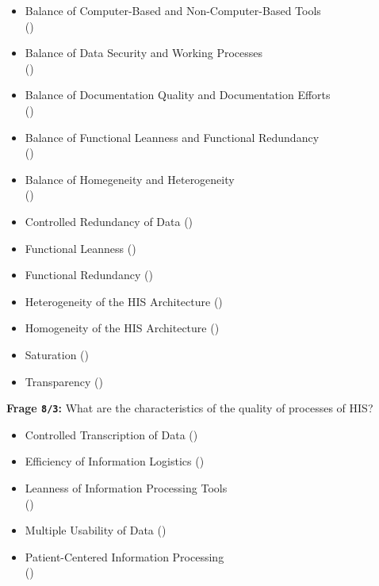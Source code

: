 \begin{itemize}
  \item Balance of Computer-Based and Non-Computer-Based Tools \\
  ()
  \item Balance of Data Security and Working Processes \\
  ()
  \item Balance of Documentation Quality and Documentation Efforts \\
  ()
  \item Balance of Functional Leanness and Functional Redundancy \\
  ()
  \item Balance of Homegeneity and Heterogeneity \\
  ()
  \item Controlled Redundancy of Data ()
  \item Functional Leanness ()
  \item Functional Redundancy ()
  \item Heterogeneity of the HIS Architecture ()
  \item Homogeneity of the HIS Architecture ()
  \item Saturation ()
  \item Transparency ()
\end{itemize}

\textbf{Frage \texttt{8/3}:} What are the characteristics of the quality of processes of HIS?

\begin{itemize}
  \item Controlled Transcription of Data ()
  \item Efficiency of Information Logistics ()
  \item Leanness of Information Processing Tools \\
  ()
  \item Multiple Usability of Data ()
  \item Patient-Centered Information Processing \\
  ()
\end{itemize}


